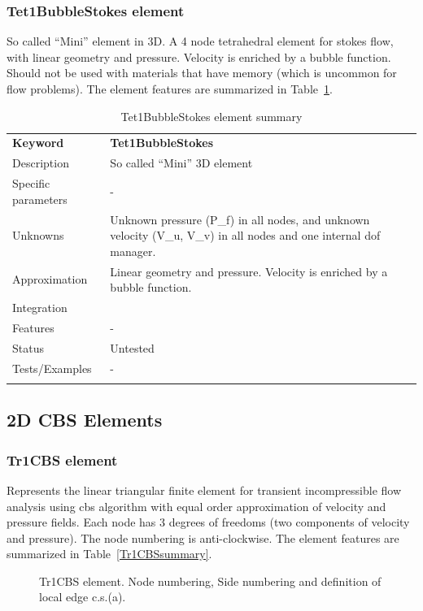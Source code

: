 \documentclass[a4paper]{article}
\newcommand{\param}[1]{\texttt{#1}} %
\newcommand{\templabel}{}%
\newcommand{\tempcaption}{}%
\newcounter{nelpar}
\newenvironment{elementsummary}[5]{%
  \gdef\tempcaption{#4}%
  \gdef\templabel{#5}%
  \setcounter{nelpar}{0}%
  \begin{center} %
    \begin{table}[!htb] %
      \begin{tabular}{|l|p{9cm}|}\hline %
        {\bf Keyword} & \bf{#1}\\ %
        {Description} & {#2}\\ %
        {Specific parameters} & {#3}\\ \hline %
}{
  \\ \hline %
      \end{tabular}%
      \caption{\tempcaption}%
      \label{\templabel}%
    \end{table}%
  \end{center}%
}
\newcommand{\elementParam}[1]{%
  \ifthenelse{\value{nelpar}>0} %
             {&{#1}}%
             {\setcounter{nelpar}{1}Parameters&{#1}}%
             \\%
}
\newcommand{\elementDescription}[2]{{#1} & {#2}\\}
\begin{document}
\subsubsection{Tet1BubbleStokes element}
So called ``Mini'' element in 3D. A 4 node tetrahedral element for stokes flow, with linear geometry and pressure. Velocity is enriched by a bubble function.
Should not be used with materials that have memory (which is uncommon for flow problems). The element features are summarized in Table~\ref{Tet1BubbleStokessummary}.

\begin{elementsummary}{Tet1BubbleStokes}{So called ``Mini'' 3D element}{-}{Tet1BubbleStokes element summary}{Tet1BubbleStokessummary}
\elementDescription{Unknowns}{Unknown pressure (P\_f) in all nodes, and unknown velocity (V\_u, V\_v) in all nodes and one internal dof manager.}
\elementDescription{Approximation}{Linear geometry and pressure. Velocity is enriched by a bubble function.}
\elementDescription{Integration}{}
\elementDescription{Features}{-}
\elementDescription{Status}{Untested}
\elementDescription{Tests/Examples}{-}
\end{elementsummary}

\clearpage
\subsection{2D CBS Elements}
\subsubsection{Tr1CBS element}
\label{Tr1CBS}
Represents the linear triangular finite element for transient
incompressible flow analysis using cbs algorithm with equal order
approximation of velocity and pressure fields. Each node has 3 degrees
of freedoms (two components of velocity and pressure).
The node numbering is anti-clockwise. The element features are summarized in Table~\ref{Tr1CBSsummary}.

\begin{figure}[htb]
 \centering
 \begin{makeimage}
  
 \end{makeimage}
 \caption{Tr1CBS element. Node numbering, Side numbering and
 definition of local edge c.s.(a).}
 \label{Tr1CBSfig}
\end{figure}
\end{document}
